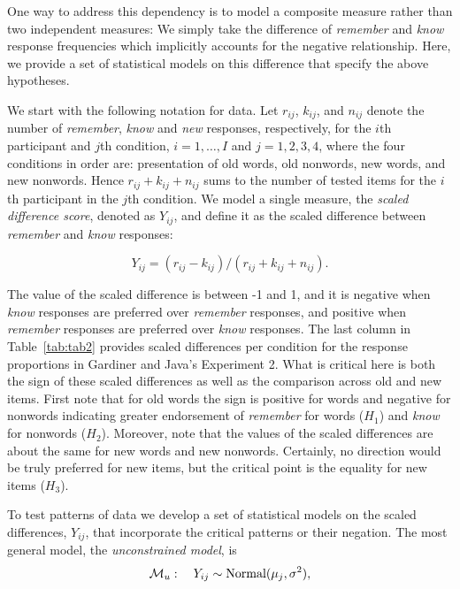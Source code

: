 \documentclass[english,,man]{apa6}
\begin{document}
One way to address this dependency is to model a composite measure rather than two independent measures: We simply take the difference of \emph{remember} and \emph{know} response frequencies which implicitly accounts for the negative relationship. Here, we provide a set of statistical models on this difference that specify the above hypotheses.

We start with the following notation for data. Let \(r_{ij}\), \(k_{ij}\), and \(n_{ij}\) denote the number of \emph{remember}, \emph{know} and \emph{new} responses, respectively, for the \(i\)th participant and \(j\)th condition, \(i=1,\ldots,I\) and \(j=1, 2, 3, 4\), where the four conditions in order are: presentation of old words, old nonwords, new words, and new nonwords. Hence \(r_{ij} + k_{ij} + n_{ij}\) sums to the number of tested items for the \(i\)th participant in the \(j\)th condition. We model a single measure, the \emph{scaled difference score}, denoted as \(Y_{ij}\), and define it as the scaled difference between \emph{remember} and \emph{know} responses:

\begin{equation} \label{eq:yij}
Y_{ij}=(r_{ij} - k_{ij})/(r_{ij} + k_{ij} + n_{ij}).
\end{equation}

The value of the scaled difference is between -1 and 1, and it is negative when \emph{know} responses are preferred over \emph{remember} responses, and positive when \emph{remember} responses are preferred over \emph{know} responses. The last column in Table~\ref{tab:tab2} provides scaled differences per condition for the response proportions in Gardiner and Java's Experiment 2. What is critical here is both the sign of these scaled differences as well as the comparison across old and new items. First note that for old words the sign is positive for words and negative for nonwords indicating greater endorsement of \emph{remember} for words (\(H_1\)) and \emph{know} for nonwords (\(H_2\)). Moreover, note that the values of the scaled differences are about the same for new words and new nonwords. Certainly, no direction would be truly preferred for new items, but the critical point is the equality for new items (\(H_3\)).

To test patterns of data we develop a set of statistical models on the scaled differences, \(Y_{ij}\), that incorporate the critical patterns or their negation. The most general model, the \emph{unconstrained model}, is
\[
{\cal M}_u: \quad Y_{ij}\sim\mbox{Normal}(\mu_j,\sigma^2),
\]
\end{document}
